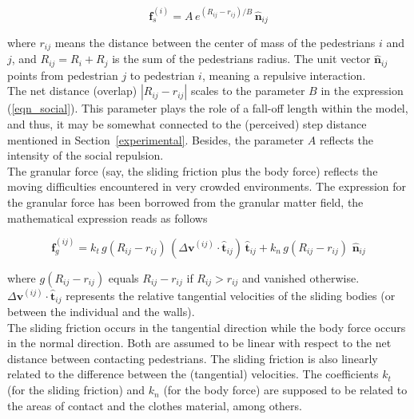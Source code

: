 \documentclass[preprint,12pt]{elsarticle}
\begin{document}
\begin{equation}
 \mathbf{f}_s^{(i)}=A\,e^{(R_{ij}-r_{ij})/B}\,\hat{\mathbf{n}}_{ij}
 \label{eqn_social}
\end{equation}

\noindent where $r_{ij}$ means the distance between the center of mass of the
pedestrians $i$ and $j$, and $R_{ij}=R_i+R_j$ is the sum of the pedestrians
radius. The unit vector $\hat{\mathbf{n}}_{ij}$ points from pedestrian $j$ to
pedestrian $i$, meaning a repulsive interaction.\\

The net distance (overlap) $|R_{ij}-r_{ij}|$ scales to the parameter $B$ in the
expression (\ref{eqn_social}). This parameter plays the role of a fall-off
length within the model, and thus, it may be somewhat connected to the
(perceived) step distance mentioned in Section~\ref{experimental}.  Besides, the
parameter $A$ reflects the intensity of the social repulsion. \\

The granular force (say, the sliding friction plus the body force) reflects  the
moving difficulties encountered in very crowded environments. The  expression
for the granular force has been borrowed from the granular  matter field, the
mathematical expression reads as follows

\begin{equation}
 \mathbf{f}_g^{(ij)}=k_t\,g(R_{ij}-r_{ij})\,
(\Delta\mathbf{v}^{(ij)}\cdot\hat{\mathbf{t}}_{ij})\,\hat{\mathbf{t}}_{ij}+
k_n\,g(R_{ij}-r_{ij})\,
\,\hat{\mathbf{n}}_{ij}\label{eqn_friction}
\end{equation}

\noindent where $g(R_{ij}-r_{ij})$ equals $R_{ij}-r_{ij}$ if $R_{ij}>r_{ij}$ and
vanished otherwise. $\Delta\mathbf{v}^{(ij)}\cdot\hat{\mathbf{t}}_{ij}$
represents the relative tangential velocities of the sliding  bodies (or between
the individual and the walls).    \\

The sliding friction occurs in the tangential direction while the body force
occurs in the normal direction. Both are assumed to be linear with respect to
the net distance between contacting pedestrians. The sliding friction is also
linearly related to the difference between the (tangential) velocities. The
coefficients $k_t$ (for the sliding friction) and $k_n$ (for the  body force)
are supposed to be related to the areas of contact and the clothes  material,
among others. \\
\end{document}
